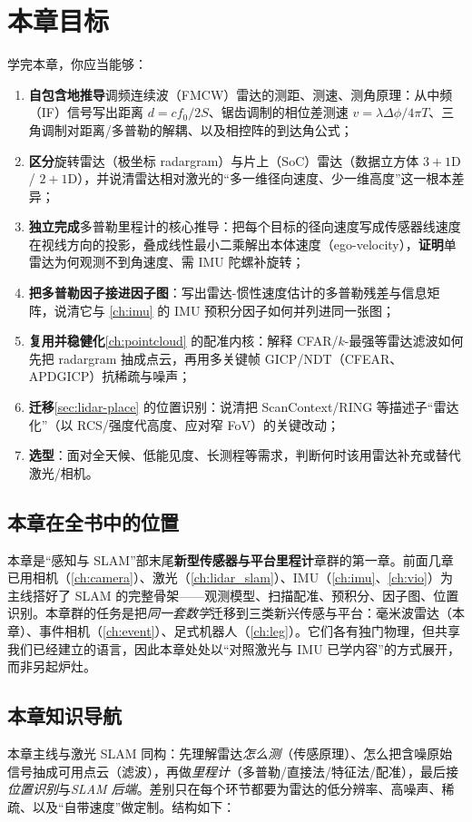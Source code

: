 \section*{本章目标}
学完本章，你应当能够：
\begin{enumerate}
  \item \textbf{自包含地推导}调频连续波（FMCW）雷达的测距、测速、测角原理：从中频（IF）信号写出距离 $d=cf_0/2S$、锯齿调制的相位差测速 $v=\lambda\Delta\phi/4\pi T$、三角调制对距离/多普勒的解耦、以及相控阵的到达角公式；
  \item \textbf{区分}旋转雷达（极坐标 radargram）与片上（SoC）雷达（数据立方体 $3{+}1$D / $2{+}1$D），并说清雷达相对激光的“多一维径向速度、少一维高度”这一根本差异；
  \item \textbf{独立完成}多普勒里程计的核心推导：把每个目标的径向速度写成传感器线速度在视线方向的投影，叠成线性最小二乘解出本体速度（ego-velocity），\textbf{证明}单雷达为何观测不到角速度、需 IMU 陀螺补旋转；
  \item \textbf{把多普勒因子接进因子图}：写出雷达-惯性速度估计的多普勒残差与信息矩阵，说清它与 \cref{ch:imu} 的 IMU 预积分因子如何并列进同一张图；
  \item \textbf{复用并稳健化}\cref{ch:pointcloud} 的配准内核：解释 CFAR/$k$-最强等雷达滤波如何先把 radargram 抽成点云，再用多关键帧 GICP/NDT（CFEAR、APDGICP）抗稀疏与噪声；
  \item \textbf{迁移}\cref{sec:lidar-place} 的位置识别：说清把 ScanContext/RING 等描述子“雷达化”（以 RCS/强度代高度、应对窄 FoV）的关键改动；
  \item \textbf{选型}：面对全天候、低能见度、长测程等需求，判断何时该用雷达补充或替代激光/相机。
\end{enumerate}

\subsection*{本章在全书中的位置}
本章是“感知与 SLAM”部末尾\textbf{新型传感器与平台里程计}章群的第一章。前面几章已用相机（\cref{ch:camera}）、激光（\cref{ch:lidar_slam}）、IMU（\cref{ch:imu}、\cref{ch:vio}）为主线搭好了 SLAM 的完整骨架——观测模型、扫描配准、预积分、因子图、位置识别。本章群的任务是把\emph{同一套数学}迁移到三类新兴传感与平台：毫米波雷达（本章）、事件相机（\cref{ch:event}）、足式机器人（\cref{ch:leg}）。它们各有独门物理，但共享我们已经建立的语言，因此本章处处以“对照激光与 IMU 已学内容”的方式展开，而非另起炉灶。

\subsection*{本章知识导航}
本章主线与激光 SLAM 同构：先理解雷达\emph{怎么测}（传感原理）、怎么把含噪原始信号抽成可用点云（滤波），再做\emph{里程计}（多普勒/直接法/特征法/配准），最后接\emph{位置识别}与\emph{SLAM 后端}。差别只在每个环节都要为雷达的低分辨率、高噪声、稀疏、以及“自带速度”做定制。结构如下：

